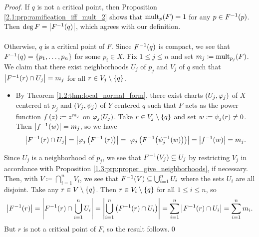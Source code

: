 \documentclass[../Moduli_Spaces_of_Riemann_Surfaces.tex]{subfiles}
\begin{document}
    \begin{proof}
        If $q$ is not a critical point, then Proposition \ref{2.1:prp:ramification_iff_mult_2} shows that $\operatorname{mult}_p\!\left(F\right)=1$ for any $p\in F^{-1}\!\left(p\right)$. Then $\deg F=\left|F^{-1}\!\left(q\right)\right|$, which agrees with our definition.\\\ \\
        Otherwise, $q$ is a critical point of $F$. Since $F^{-1}\!\left(q\right)$ is compact, we see that $F^{-1}\!\left(q\right)=\left\{p_1,\dots,p_n\right\}$ for some $p_i\in X$. Fix $1\leq j\leq n$ and set $m_j\coloneqq\operatorname{mult}_{p_j}\!\left(F\right)$. We claim that there exist neighborhoods $U_j$ of $p_j$ and $V_j$ of $q$ such that $\left|F^{-1}\!\left(r\right)\cap U_j\right|=m_j$ for all $r\in V_j\setminus\left\{q\right\}$.
        \begin{itemize}
            \item By Theorem \ref{1.2:thm:local_normal_form}, there exist charts $\left(U_j,\varphi_j\right)$ of $X$ centered at $p_j$ and $\left(V_j,\psi_j\right)$ of $Y$ centered $q$ such that $F$ acts as the power function $f\left(z\right)\coloneqq z^{m_j}$ on $\varphi_j\!\left(U_j\right)$. Take $r\in V_j\setminus\left\{q\right\}$ and set $w\coloneqq\psi_j\!\left(r\right)\neq0$. Then $\left|f^{-1}\!\left(w\right)\right|=m_j$, so we have
                \begin{equation*}
                    \left|F^{-1}\!\left(r\right)\cap U_j\right|=\left|\varphi_j\left(F^{-1}\left(r\right)\right)\right|=\left|\varphi_j\left(F^{-1}\!\left(\psi_j^{-1}\!\left(w\right)\right)\right)\right|=\left|f^{-1}\!\left(w\right)\right|=m_j.
                \end{equation*}
        \end{itemize}
        Since $U_j$ is a neighborhood of $p_j$, we see that $F^{-1}\!\left(V_j\right)\subseteq U_j$ by restricting $V_j$ in accordance with Proposition \ref{1.3:prp:proper_give_neighborhoods}, if necessary. Then, with $V\coloneqq\bigcap_{i=1}^{n}V_i$, we see that $F^{-1}\!\left(V\right)\subseteq\bigcup_{i=1}^{n}U_i$ where the sets $U_i$ are all disjoint. Take any $r\in V\setminus\left\{q\right\}$. Then $r\in V_i\setminus\left\{q\right\}$ for all $1\leq i\leq n$, so
        \begin{equation*}
            \left|F^{-1}\!\left(r\right)\right|=\left|F^{-1}\!\left(r\right)\cap\bigcup_{i=1}^{n}U_i\right|=\left|\bigcup_{i=1}^{n}\left(F^{-1}\!\left(r\right)\cap U_i\right)\right|=\sum_{i=1}^{n}\left|F^{-1}\!\left(r\right)\cap U_i\right|=\sum_{i=1}^{n}m_i.
        \end{equation*}
        But $r$ is not a critical point of $F$, so the result follows.\qed
    \end{proof}
\end{document}
